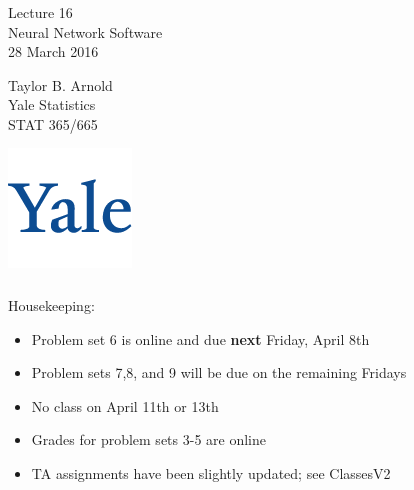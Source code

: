 \documentclass[xetex,mathserif,serif,aspectratio=169]{beamer}
\begin{document}
\begin{frame}[fragile] \frametitle{} \oldB \small

\vfill

{\fontsize{0.7cm}{0cm}\selectfont Lecture 16 \\\vspace{0.2cm}
Neural Network Software}\\\vspace{0.5cm}
28 March 2016

\vspace{2cm}

\begin{minipage}{0.6\textwidth}
Taylor B. Arnold \\
Yale Statistics \\
STAT 365/665
\end{minipage}
\hfill
\begin{minipage}{0.3\textwidth}\raggedleft
\includegraphics[scale=0.3]{../yale-logo.png}
\end{minipage}%

\end{frame}

\begin{frame}[fragile] \frametitle{} \oldB \small

Housekeeping:
\begin{itemize}
\item Problem set 6 is online and due \textbf{next} Friday, April 8th
\item Problem sets 7,8, and 9 will be due on the remaining Fridays
\item No class on April 11th or 13th
\item Grades for problem sets 3-5 are online
\item TA assignments have been slightly updated; see ClassesV2
\end{itemize}

\end{frame}
\end{document}
